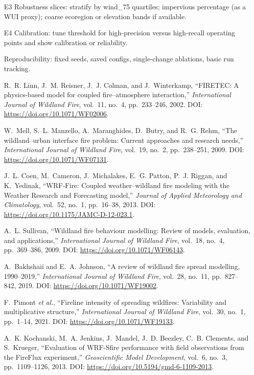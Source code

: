 \documentclass[conference]{IEEEtran}
\begin{document}
E3 Robustness slices: stratify by wind\_75 quartiles; impervious percentage (as a WUI proxy); coarse ecoregion or elevation bands if available.

E4 Calibration: tune threshold for high-precision versus high-recall operating points and show calibration or reliability.

Reproducibility: fixed seeds, saved configs, single-change ablations, basic run tracking.

\begin{thebibliography}{00}
R.~R. Linn, J.~M. Reisner, J.~J. Colman, and J.~Winterkamp,
``FIRETEC: A physics-based model for coupled fire--atmosphere interaction,''
\emph{International Journal of Wildland Fire}, vol.~11, no.~4, pp.~233--246, 2002. DOI: \url{https://doi.org/10.1071/WF02006}.

W.~Mell, S.~L. Manzello, A.~Maranghides, D.~Butry, and R.~G. Rehm,
``The wildland--urban interface fire problem: Current approaches and research needs,''
\emph{International Journal of Wildland Fire}, vol.~19, no.~2, pp.~238--251, 2009. DOI: \url{https://doi.org/10.1071/WF07131}.

J.~L. Coen, M.~Cameron, J.~Michalakes, E.~G. Patton, P.~J. Riggan, and K.~Yedinak,
``WRF-Fire: Coupled weather--wildland fire modeling with the Weather Research and Forecasting model,''
\emph{Journal of Applied Meteorology and Climatology}, vol.~52, no.~1, pp.~16--38, 2013. DOI: \url{https://doi.org/10.1175/JAMC-D-12-023.1}.

A.~L. Sullivan,
``Wildland fire behaviour modelling: Review of models, evaluation, and applications,''
\emph{International Journal of Wildland Fire}, vol.~18, no.~4, pp.~369--386, 2009. DOI: \url{https://doi.org/10.1071/WF06143}.

A.~Bakhshaii and E.~A. Johnson,
``A review of wildland fire spread modelling, 1990--2019,''
\emph{International Journal of Wildland Fire}, vol.~28, no.~11, pp.~827--842, 2019. DOI: \url{https://doi.org/10.1071/WF19002}.

F.~Pimont \emph{et al.},
``Fireline intensity of spreading wildfires: Variability and multiplicative structure,''
\emph{International Journal of Wildland Fire}, vol.~30, no.~1, pp.~1--14, 2021. DOI: \url{https://doi.org/10.1071/WF19133}.

A.~K. Kochanski, M.~A. Jenkins, J.~Mandel, J.~D. Beezley, C.~B. Clements, and S.~Krueger,
``Evaluation of WRF-Sfire performance with field observations from the FireFlux experiment,''
\emph{Geoscientific Model Development}, vol.~6, no.~3, pp.~1109--1126, 2013. DOI: \url{https://doi.org/10.5194/gmd-6-1109-2013}.


\end{thebibliography}
\end{document}
